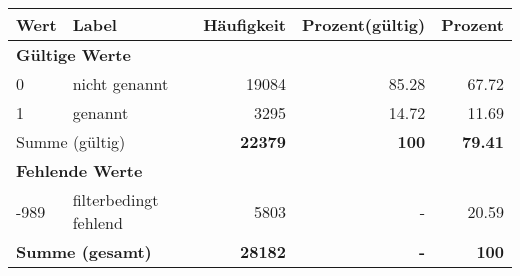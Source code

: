      \begin{longtable}{lXrrr}
     \toprule
     \textbf{Wert} & \textbf{Label} & \textbf{Häufigkeit} & \textbf{Prozent(gültig)} & \textbf{Prozent} \\
     \endhead
     \midrule
     \multicolumn{5}{l}{\textbf{Gültige Werte}}\\

     0 &
     \multicolumn{1}{X}{ nicht genannt   } &


       \num{19084} &
       \num[round-mode=places,round-precision=2]{85,28} &
         \num[round-mode=places,round-precision=2]{67,72} \\

     1 &
     \multicolumn{1}{X}{ genannt   } &


       \num{3295} &
       \num[round-mode=places,round-precision=2]{14,72} &
         \num[round-mode=places,round-precision=2]{11,69} \\
     \midrule
     \multicolumn{2}{l}{Summe (gültig)} &
       \textbf{\num{22379}} &
     \textbf{100} &
       \textbf{\num[round-mode=places,round-precision=2]{79,41}} \\
     \multicolumn{5}{l}{\textbf{Fehlende Werte}}\\
       -989 &
       filterbedingt fehlend &
         \num{5803} &
        - &
         \num[round-mode=places,round-precision=2]{20,59} \\
     \midrule
     \multicolumn{2}{l}{\textbf{Summe (gesamt)}} &
          \textbf{\num{28182}} &
        \textbf{-} &
        \textbf{100} \\
     \bottomrule
     \end{longtable}
     
